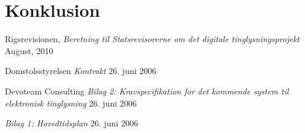\documentclass[10pt,a4paper,danish]{article}
\begin{document}
\section{Konklusion}


\begin{thebibliography}{9}

  Rigsrevisionen,
  \emph{Beretning til Statsrevisorerne om det digitale
  tinglysningsprojekt}
  August, 2010

Domstolsstyrelsen
  \emph{Kontrakt}
  26. juni 2006

  Devoteam Consulting
  \emph{Bilag 2: Kravspecifikation for det kommende
  system til elektronisk tinglysning}
  26. juni 2006

  \emph{Bilag 1: Hovedtidsplan}
  26. juni 2006

\end{thebibliography}
\end{document}

